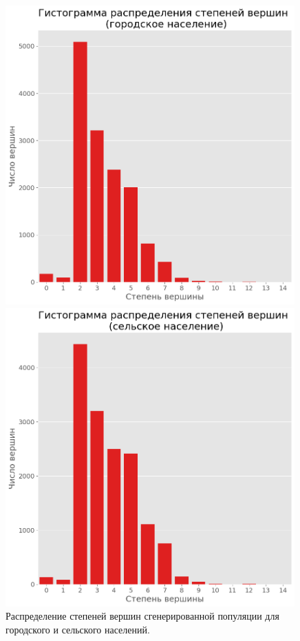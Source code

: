 \documentclass[14pt,a4paper]{article}
\begin{document}
\begin{figure}[h!]
	\begin{minipage}{0.5\textwidth}
		\centering
		\includegraphics[width=0.99\textwidth]{img/nodes_degrees_urban.png}
	\end{minipage}
	\begin{minipage}{0.5\textwidth}
		\centering
		\includegraphics[width=0.99\textwidth]{img/nodes_degrees_rural.png}
	\end{minipage}
	\caption{Распределение степеней вершин сгенерированной популяции для городского и сельского населений.}
	\label{fig:nodes_degrees}
\end{figure}
\end{document}
